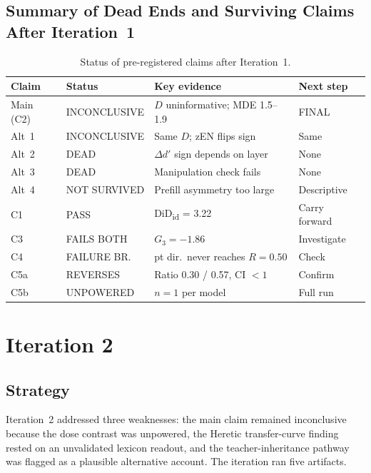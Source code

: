 \documentclass[11pt,letterpaper]{article}
\begin{document}
\subsection{Summary of Dead Ends and Surviving Claims After Iteration~1}

\begin{table}[!htbp]
\centering
\caption{Status of pre-registered claims after Iteration~1.}
\label{tab:claims_iter1}
{\footnotesize
\begin{tabularx}{\linewidth}{p{1.8cm}p{2.7cm}Xp{1.8cm}}
\toprule
Claim & Status & Key evidence & Next step \\
\midrule
Main (C2) & INCONCLUSIVE & $D$ uninformative; MDE 1.5--1.9 & FINAL \\
Alt~1 & INCONCLUSIVE & Same $D$; zEN flips sign & Same \\
Alt~2 & DEAD & $\Delta d'$ sign depends on layer & None \\
Alt~3 & DEAD & Manipulation check fails & None \\
Alt~4 & NOT SURVIVED & Prefill asymmetry too large & Descriptive \\
C1 & PASS & DiD\textsubscript{id} = 3.22 & Carry forward \\
C3 & FAILS BOTH & $G_3 = -1.86$ & Investigate \\
C4 & FAILURE BR. & pt dir.\ never reaches $R = 0.50$ & Check \\
C5a & REVERSES & Ratio 0.30 / 0.57, CI $< 1$ & Confirm \\
C5b & UNPOWERED & $n = 1$ per model & Full run \\
\bottomrule
\end{tabularx}
}
\end{table}


\section{Iteration 2}

\subsection{Strategy}

Iteration~2 addressed three weaknesses: the main claim remained inconclusive because the dose contrast was unpowered, the Heretic transfer-curve finding rested on an unvalidated lexicon readout, and the teacher-inheritance pathway was flagged as a plausible alternative account. The iteration ran five artifacts.
\end{document}
